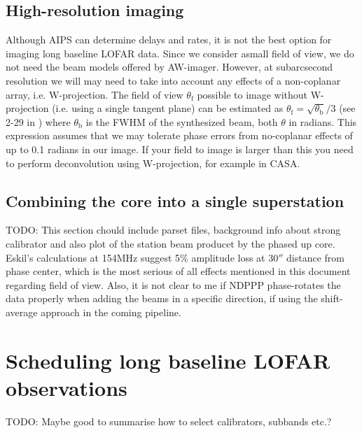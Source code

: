 \subsection{High-resolution imaging}
Although AIPS can determine delays and rates, it is not the best option for
imaging long baseline LOFAR data. Since we consider asmall field of view, we do
not need the beam models offered by AW-imager. However, at subarcsecond
resolution we will may need to take into account any effects of a non-coplanar
array, i.e. W-projection. The field of view $\theta_\mathrm{f}$ possible to
image without W-projection (i.e. using a single tangent plane) can be estimated
as $\theta_{\mathrm{f}} = \sqrt{\theta_{\mathrm{b}}}/3$ (see 2-29 in
\cite{NRAO}) where $\theta_\mathrm{b}$ is the FWHM of the synthesized beam,
both $\theta$ in radians. This expression assumes that we may tolerate phase errors
from no-coplanar effects of up to 0.1 radians in our image.
If your field to image is larger than this you need to
perform deconvolution using W-projection, for example in CASA.

\subsection{Combining the core into a single superstation}
\label{sect:phaseup}
TODO: This section chould include parset files, background info about strong
calibrator and also plot of the station beam producet by the phased up core.
Eskil's calculations at 154MHz suggest 5\% amplitude loss at 30$''$ distance
from phase center, which is the most serious of all effects mentioned in this
document regarding field of view. Also, it is not clear to me if NDPPP
phase-rotates the data properly when adding the beams in a specific direction,
if using the shift-average approach in the coming pipeline.

\section{Scheduling long baseline LOFAR observations}
\label{sect:sched}
TODO: Maybe good to summarise how to select calibrators, subbands etc.?

